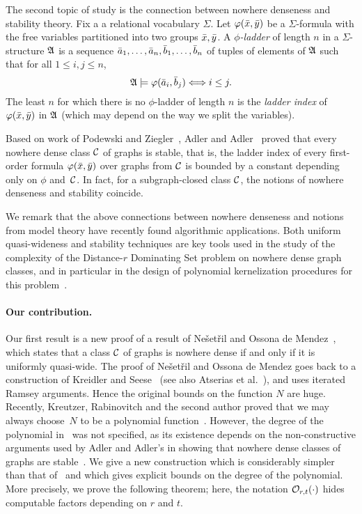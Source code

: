 The second topic of study is the
connection between nowhere denseness and stability theory. 
Fix a 
 a relational vocabulary $\Sigma$. Let 
$\varphi(\bar{x},\bar{y})$ be a $\Sigma$-formula with the free variables
partitioned into two groups $\bar{x}, \bar{y}$. A \emph{$\phi$-ladder}
of length $n$ in a $\Sigma$-structure $\mathfrak A$ is a sequence $\bar{a}_1,\ldots, \bar{a}_{n},
\bar{b}_1,\ldots, \bar{b}_{n}$ of tuples of elements of $\mathfrak A$ 
such that for all $1\leq i,j\le n$,
\[\mathfrak{A}\models\varphi(\bar{a}_i,\bar{b}_j)\Longleftrightarrow i\leq j. \]
The least  $n$ for which 
there is no $\phi$-ladder of length $n$ is 
the \emph{ladder index} 
of $\varphi(\bar{x},\bar{y})$ in $\mathfrak A$ (which may depend on the way we split the
variables). 

Based on work of Podewski and Ziegler~\cite{podewski1978stable}, 
Adler and Adler~\cite{adler2014interpreting}
proved that every nowhere dense class $\mathcal{C}$ of graphs is stable, that is, 
the ladder index of every first-order formula $\varphi(\bar{x},\bar{y})$ over
graphs from $\mathcal{C}$ is bounded by a constant depending only on $\phi$ 
and~$\mathcal{C}$. In fact, for a subgraph-closed class $\mathcal{C}$, the notions of nowhere denseness and stability coincide.

We remark that the above connections between nowhere denseness and notions from model theory have recently found algorithmic applications.
Both uniform quasi-wideness and stability techniques are key tools used in the study of the complexity of the {\sc Distance-$r$ Dominating Set} problem on nowhere dense graph classes,
and in particular in the design of polynomial kernelization procedures for this problem~\cite{DawarK09,drange2016kernelization,eickmeyer2016neighborhood,siebertz2016polynomial}.

\paragraph{Our contribution.} 
Our first result is  a new proof of a result of
Ne\v{s}et\v{r}il and Ossona de Mendez~\cite{nevsetvril2010first},
which states that a class $\mathcal{C}$ of graphs is nowhere dense if and only if it
is uniformly quasi-wide. The proof of Ne\v{s}et\v{r}il 
and Ossona de Mendez goes back to a construction
of Kreidler and Seese~\cite{kreidler1998monadic} (see also Atserias et al.~\cite{atserias2006preservation}), 
and uses iterated Ramsey arguments. Hence the original bounds on 
the function $N$ are huge. Recently, Kreutzer, Rabinovitch and the second author
 proved that we may always choose~$N$ to be a polynomial 
function~\cite{siebertz2016polynomial}. However, the degree of the polynomial 
in~\cite{siebertz2016polynomial} was  not specified, as its existence 
depends on the non-constructive arguments used by Adler and Adler's in showing that nowhere dense classes of graphs
are stable~\cite{adler2014interpreting}. We give a new construction 
which is considerably simpler than that of~\cite{siebertz2016polynomial}
and which gives explicit bounds on the degree of the polynomial. 
More precisely, we prove the following theorem; here, the notation $\mathcal{O}_{r,t}(\cdot)$ hides computable factors depending on $r$ and $t$.


